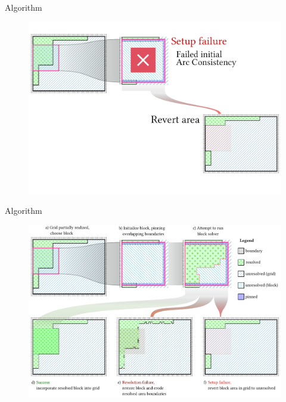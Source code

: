 \documentclass{beamer}
\begin{document}
  \begin{frame}[fragile]{Algorithm}
    \begin{figure}
      \includegraphics[width=\textwidth]{figs/poms_alg6_2.pdf}
    \end{figure}
  \end{frame}

  \begin{frame}[fragile]{Algorithm}
    \begin{figure}
      \includegraphics[width=\textwidth]{figs/poms_figalg.pdf}
    \end{figure}
  \end{frame}

%
\end{document}
